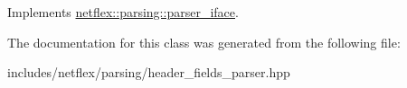 Implements \hyperlink{classnetflex_1_1parsing_1_1parser__iface_a6b092567e70a5c0bf7568e94d06f7154}{netflex\+::parsing\+::parser\+\_\+iface}.



The documentation for this class was generated from the following file\+:\begin{DoxyCompactItemize}
\item 
includes/netflex/parsing/header\+\_\+fields\+\_\+parser.\+hpp\end{DoxyCompactItemize}
